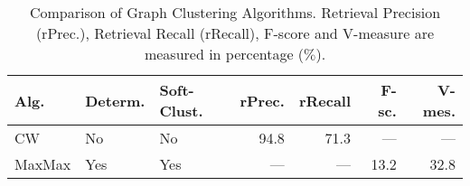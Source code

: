 \begin{table}
\centering
\caption[Comparison of Graph Clustering Algorithms]
{Comparison of Graph Clustering Algorithms. Retrieval Precision (rPrec.),
Retrieval Recall (rRecall), F-score and V-measure are measured in percentage
($\%$).}
\label{tab:clalg}

\begin{tabu} to \textwidth {Xllrrrr}
\hline
\textbf{Alg.} & \textbf{Determ.} & \textbf{Soft-Clust.} & \textbf{rPrec.} & \textbf{rRecall} & \textbf{F-sc.} & \textbf{V-mes.} \\
\hline
\ac{CW} \cite{biemann2006chinese} & No            & No              & 94.8 & 71.3 & ---  & ---  \\
MaxMax \cite{hope2013maxmax}      & Yes           & Yes             & ---  & ---  & 13.2 & 32.8 \\
\hline
\end{tabu}
\end{table}

